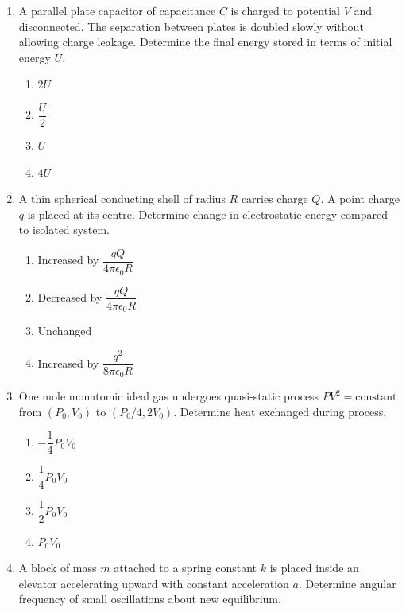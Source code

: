 \documentclass[12pt]{article}
\begin{document}
\begin{enumerate}
\item A parallel plate capacitor of capacitance $C$ is charged to potential $V$ and disconnected. The separation between plates is doubled slowly without allowing charge leakage. Determine the final energy stored in terms of initial energy $U$.

\begin{enumerate}
\item $2U$
\item $\dfrac{U}{2}$
\item $U$
\item $4U$
\end{enumerate}

\item A thin spherical conducting shell of radius $R$ carries charge $Q$. A point charge $q$ is placed at its centre. Determine change in electrostatic energy compared to isolated system.

\begin{center}
\end{center}

\begin{enumerate}
\item Increased by $\dfrac{qQ}{4\pi\epsilon_0R}$
\item Decreased by $\dfrac{qQ}{4\pi\epsilon_0R}$
\item Unchanged
\item Increased by $\dfrac{q^2}{8\pi\epsilon_0R}$
\end{enumerate}

\item One mole monatomic ideal gas undergoes quasi-static process $PV^2=\text{constant}$ from $(P_0,V_0)$ to $(P_0/4,2V_0)$. Determine heat exchanged during process.

\begin{enumerate}
\item $-\dfrac{1}{4}P_0V_0$
\item $\dfrac{1}{4}P_0V_0$
\item $\dfrac{1}{2}P_0V_0$
\item $P_0V_0$
\end{enumerate}

\item A block of mass $m$ attached to a spring constant $k$ is placed inside an elevator accelerating upward with constant acceleration $a$. Determine angular frequency of small oscillations about new equilibrium.


\end{enumerate}
\end{document}

